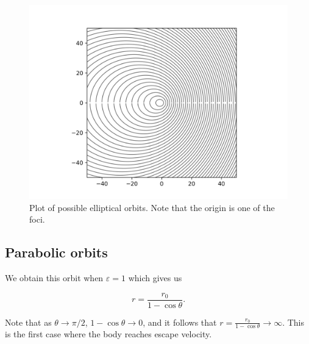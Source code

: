 \begin{frame}{\subsecname}
\begin{figure}
    \centering
    \includegraphics[height = 0.8\textheight]{assets/ellipse.png}
    \caption{Plot of possible elliptical orbits. Note that the origin is one of the foci.}
    \label{fig:my_label}
\end{figure}
\end{frame}

\subsection{Parabolic orbits}
\begin{frame}{\subsecname}

We obtain this orbit when \(\varepsilon = 1\) which gives us

\begin{equation}
    r = \frac{r_0}{1-\cos \theta}.
\end{equation}

Note that as \(\theta \to \pi/2 \), \(1-\cos \theta \to 0\), and it follows that \(r = \frac{r_0}{1-\cos\theta} \to \infty\). This is the first case where the body reaches escape velocity. 

\end{frame}

